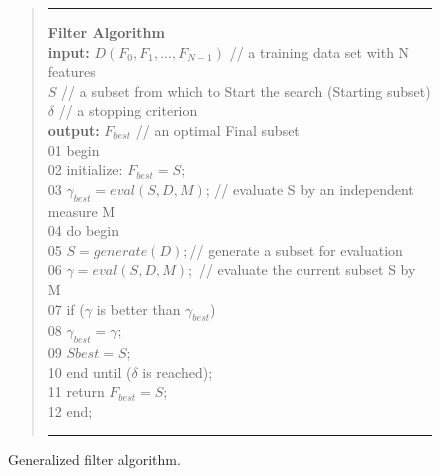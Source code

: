 \documentclass[a4paper,fleqn]{report}
\begin{document}
\begin{figure}[h]
\begin{quote}
\hrule width 5.6 in
\vspace{0.5cm}
{\bf Filter Algorithm} \\
{\bf input:} $D(F_{0}, F_{1}, ..., F_{N-1})$  // a training data set with N features \\
\hspace{2.0cm}       $S$ // a subset from which to Start the search (Starting subset) \\ 
\hspace{2.0cm}       $\delta$ // a stopping criterion \\ 
{\bf output:} $F_{best}$ // an optimal Final subset \\
01 \hspace{0.5cm} begin \\
02 \hspace{1.5cm}    initialize: $F_{best} = S$; \\
03 \hspace{1.5cm}    $\gamma_{best} = eval(S,D,M)$; // evaluate S by an independent measure M \\
04 \hspace{1.5cm}    do begin \\
05 \hspace{2.5cm}         $S = generate(D); $// generate a subset for evaluation \\
06 \hspace{2.5cm}         $\gamma = eval(S,D,M);$ // evaluate the current subset S by M \\
07 \hspace{3.0cm}           if ($\gamma$ is better than $\gamma_{best}$) \\
08 \hspace{3.5cm}             $ \gamma_{best} = \gamma;$ \\
09 \hspace{3.5cm}             $Sbest = S$; \\
10 \hspace{1.5cm}    end until ($\delta$ is reached); \\
11 \hspace{1.5cm}    return $F_{best} = S$; \\
12 \hspace{0.5cm} end; \\
\vspace{0.2cm}
\hrule width 5.6 in
\end{quote}
\label{fig:genfilter}
\caption{Generalized filter algorithm. }
\end{figure}
\end{document}
